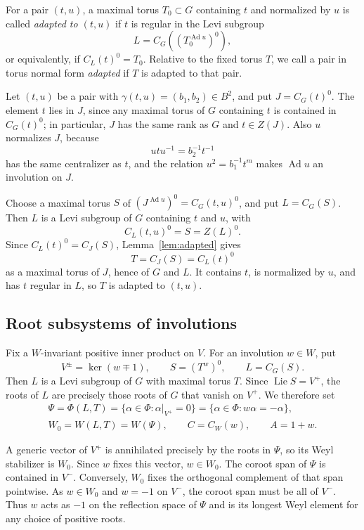 \documentclass[11pt,a4paper,reqno]{amsart}
\theoremstyle{plain}
\theoremstyle{definition}
\theoremstyle{remark}
\numberwithin{equation}{section}
\DeclareMathOperator{\Lie}{Lie}
\DeclareMathOperator{\Ad}{Ad}
\begin{document}
For a pair $(t,u)$, a maximal torus $T_0\subset G$ containing $t$ and normalized by $u$ is called \emph{adapted to $(t,u)$} if $t$ is regular in the Levi subgroup
\[
L=C_G((T_0^{\Ad u})^0),
\]
or equivalently, if $C_L(t)^0=T_0$. Relative to the fixed torus $T$, we call a pair in torus normal form \emph{adapted} if $T$ is adapted to that pair.

Let $(t,u)$ be a pair with $\gamma(t,u)=(b_1,b_2)\in B^2$, and put $J=C_G(t)^0$. The element $t$ lies in $J$, since any maximal torus of $G$ containing $t$ is contained in $C_G(t)^0$; in particular, $J$ has the same rank as $G$ and $t\in Z(J)$. Also $u$ normalizes $J$, because
\[
utu^{-1}=b_2^{-1}t^{-1}
\]
has the same centralizer as $t$, and the relation $u^2=b_1^{-1}t^m$ makes $\Ad u$ an involution on $J$.

Choose a maximal torus $S$ of $(J^{\Ad u})^0=C_G(t,u)^0$, and put $L=C_G(S)$. Then $L$ is a Levi subgroup of $G$ containing $t$ and $u$, with
\[
C_L(t,u)^0=S=Z(L)^0.
\]
Since $C_L(t)^0=C_J(S)$, Lemma~\ref{lem:adapted} gives
\begin{equation}\label{eq:adaptedtorus}
T=C_J(S)=C_L(t)^0
\end{equation}
as a maximal torus of $J$, hence of $G$ and $L$. It contains $t$, is normalized by $u$, and has $t$ regular in $L$, so $T$ is adapted to $(t,u)$.

\subsection{Root subsystems of involutions}

Fix a $W$-invariant positive inner product on $V$. For an involution $w\in W$, put
\[
V^\pm=\ker(w\mp1),\qquad S=(T^w)^0,\qquad L=C_G(S).
\]
Then $L$ is a Levi subgroup of $G$ with maximal torus $T$. Since $\Lie S=V^+$, the roots of $L$ are precisely those roots of $G$ that vanish on $V^+$. We therefore set
\begin{equation}\label{eq:rootdata}
\begin{gathered}
\Psi=\Phi(L,T) =\{\alpha\in\Phi:\alpha|_{V^+}=0\} =\{\alpha\in\Phi:w\alpha=-\alpha\},\\
W_0=W(L,T)=W(\Psi),\qquad C=C_W(w),\qquad A=1+w.
\end{gathered}
\end{equation}

A generic vector of $V^+$ is annihilated precisely by the roots in $\Psi$, so its Weyl stabilizer is $W_0$. Since $w$ fixes this vector, $w\in W_0$. The coroot span of $\Psi$ is contained in $V^-$. Conversely, $W_0$ fixes the orthogonal complement of that span pointwise. As $w\in W_0$ and $w=-1$ on $V^-$, the coroot span must be all of $V^-$. Thus $w$ acts as $-1$ on the reflection space of $\Psi$ and is its longest Weyl element for any choice of positive roots.
\end{document}
